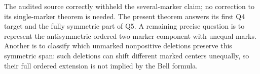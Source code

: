 The audited source correctly withheld the several-marker claim; no
correction to its single-marker theorem is needed.  The present theorem
answers its first Q4 target and the fully symmetric part of Q5.  A
remaining precise question is to represent the antisymmetric ordered
two-marker component with unequal marks.  Another is to classify which
unmarked nonpositive deletions preserve this symmetric span: such
deletions can shift different marked centers unequally, so their full
ordered extension is not implied by the Bell formula.
